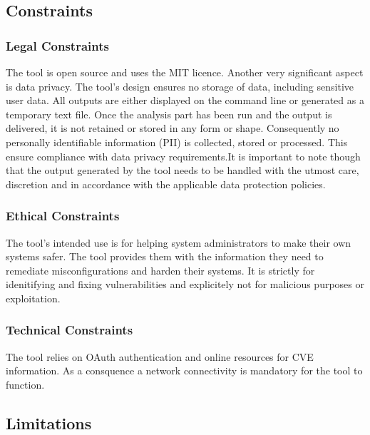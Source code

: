 \subsection{Constraints}

\subsubsection{Legal Constraints}

The tool is open source and uses the MIT licence. \newline\newline Another very significant aspect is data privacy. The tool's design ensures no storage of data, including sensitive user data. All outputs are either displayed on the command line or generated as a temporary text file. Once the analysis part has been run and the output is delivered, it is not retained or stored in any form or shape. Consequently no personally identifiable information (PII) is collected, stored or processed. This ensure compliance with data privacy requirements.\newline It is important to note though that the output generated by the tool needs to be handled with the utmost care, discretion and in accordance with the applicable data protection policies.

\subsubsection{Ethical Constraints}

The tool's intended use is for helping system administrators to make their own systems safer. The tool provides them with the information they need to remediate misconfigurations and harden their systems. It is strictly for idenitifying and fixing vulnerabilities and explicitely not for malicious purposes or exploitation.   

\subsubsection{Technical Constraints}

The tool relies on OAuth authentication and online resources for CVE information. As a consquence a network connectivity is mandatory for the tool to function.

\subsection{Limitations}

